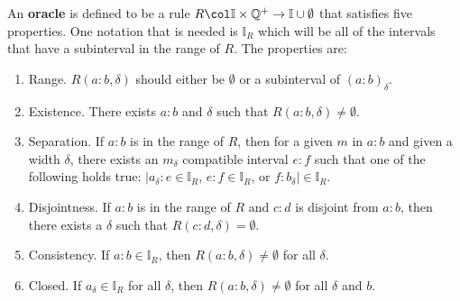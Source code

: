 \documentclass[12pt]{article}
\begin{document}
An \textbf{oracle} is defined to be a rule $R\col \mathbb{I} \times \mathbb{Q}^+ \to \mathbb{I} \cup \emptyset$ that satisfies five properties. One notation that is needed is $\mathbb{I}_R$ which will be all of the intervals that have a subinterval in the range of $R$. The properties are:
\begin{enumerate}
    \item Range. $R(a:b, \delta)$ should either be $\emptyset$ or a subinterval of $(a:b)_\delta$. 
    \item Existence. There exists $a:b$ and $\delta$ such that $R(a:b, \delta) \neq \emptyset$.
    \item Separation. 
    If $a:b$ is in the range of $R$, then for a given $m$ in $a:b$ and given a width $\delta$, there exists an $m_\delta$ compatible interval $e:f$ such that one of the following holds true:  $|a_\delta:e \in \mathbb{I}_R$, $e:f \in \mathbb{I}_R$,  or $f:b_{\delta}| \in \mathbb{I}_R$.
    
   \item Disjointness. If $a:b$ is in the range of $R$ and $c:d$ is disjoint from $a:b$, then there exists a $\delta$ such that $R(c:d, \delta) = \emptyset$.
    \item Consistency. If $a:b  \in \mathbb{I}_R$, then $R(a:b, \delta) \neq \emptyset$ for all $\delta$.
    \item Closed. If $a_\delta \in \mathbb{I}_R$ for all $\delta $, then $R(a:b, \delta) \neq \emptyset$ for all $\delta$ and $b$. 

\end{enumerate}
\end{document}
